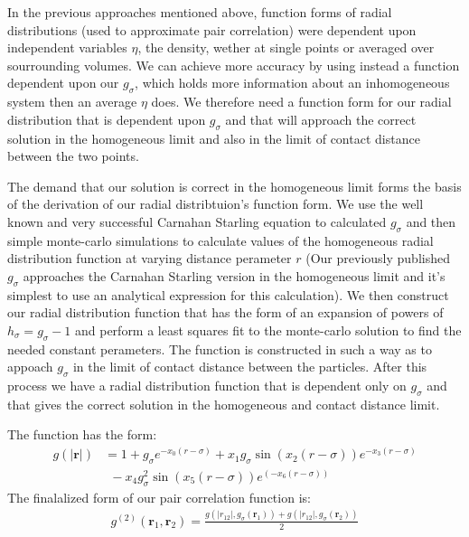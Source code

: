 \documentclass[letterpaper,twocolumn,amsmath,amssymb,pre,aps,10pt]{revtex4-1}
\newcommand{\rr}{\textbf{r}}
\begin{document}
In the previous approaches mentioned above, function forms of radial
distributions (used to approximate pair correlation) were dependent
upon independent variables $\eta$, the density, wether at single
points or averaged over sourrounding volumes.  We can achieve more
accuracy by using instead a function dependent upon our $g_{\sigma}$,
which holds more information about an inhomogeneous system
then an average $\eta$ does.  We therefore need a function form for
our radial distribution that is dependent upon $g_{\sigma}$ and that
will approach the correct solution in the homogeneous limit and also
in the limit of contact distance between the two points.

The demand that our solution is correct in the homogeneous limit forms
the basis of the derivation of our radial distribtuion's function
form. We use the well known and very successful Carnahan Starling
equation to calculated $g_{\sigma}$ and then simple monte-carlo
simulations to calculate values of the homogeneous radial distribution
function at varying distance perameter $r$ (Our previously published
$g_{\sigma}$ approaches the Carnahan Starling version in the
homogeneous limit and it's simplest to use an analytical expression
for this calculation).  We then construct our radial distribution
function that has the form of an expansion of powers of $h_{\sigma} =
g_{\sigma}-1$ and perform a least squares fit to the monte-carlo
solution to find the needed constant perameters.  The function is
constructed in such a way as to appoach $g_{\sigma}$ in the limit of
contact distance between the particles.  After this process we have a
radial distribution function that is dependent only on $g_{\sigma}$
and that gives the correct solution in the homogeneous and contact
distance limit.

The function has the form:
\begin{align}
  g(|\rr|) &= 1 + g_{\sigma}e^{-x_0(r-\sigma)} + x_1g_{\sigma}\sin(x_2(r-\sigma))e^{-x_3(r-\sigma)}\\
  &~~-x_4g_{\sigma}^2\sin(x_5(r-\sigma))e^(-x_6(r-\sigma))
\end{align}
The finalalized form of our pair correlation function is:
\begin{align}
  g^{(2)}(\rr_1,\rr_2) = \frac{g(|r_{12}|, g_\sigma(\rr_1)) + g(|r_{12}|, g_\sigma(\rr_2))}{2}
\end{align}



\end{document}
